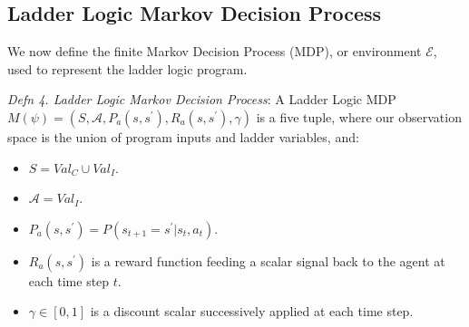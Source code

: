 \documentclass[runningheads]{llncs}
\begin{document}
\subsection{Ladder Logic Markov Decision Process}\label{subsect:MDP} 


We now define the finite Markov Decision Process (MDP), or environment $\mathcal{E}$, used to represent the ladder logic program. 

\textit{Defn 4. Ladder Logic Markov Decision Process}:
A Ladder Logic MDP $M(\psi) = (S,\mathcal{A},P_a(s,s^\prime), R_a(s,s^\prime),\gamma)$ is a five tuple, where our observation space is the union of program inputs and ladder variables, and:

\begin{itemize}
	\item $S = Val_C \cup Val_I$.
	\item $\mathcal{A} = Val_I$.
	\item $P_a(s,s^\prime) = P(s_{t+1} = s^\prime | s_t, a_t)$.
	\item $R_a(s,s^\prime)$ is a reward function feeding a scalar signal back to the agent at each time step $t$. 
	\item $\gamma \in [0,1]$ is a discount scalar successively applied at each time step.
\end{itemize}
\end{document}
